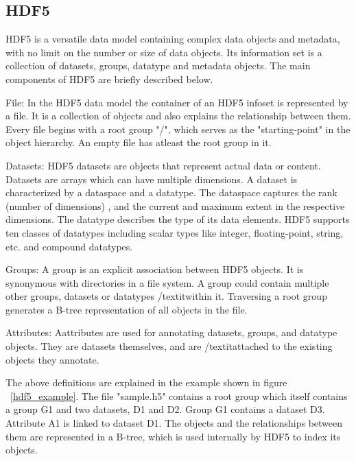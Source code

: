 \subsection{HDF5}
HDF5 is a versatile data model containing complex data objects and metadata, with no limit on the number or size of data objects. 
Its information set is a collection of datasets, groups, datatype and metadata objects. The main components of HDF5 are briefly described below.

File:
In the HDF5 data model the container of an HDF5 infoset
is represented by a file. It is a collection of objects and also explains the relationship between them.
Every file begins with a root group "/", which serves as the "starting-point" in the object hierarchy. An empty file has atleast the root group in it.

Datasets:
HDF5 datasets are objects that represent actual data or content. Datasets are arrays which can have multiple dimensions. A dataset is characterized by a dataspace and a datatype. The dataspace captures the rank (number of dimensions) , and the current and maximum extent in the respective dimensions. The datatype describes the type of its data elements. 
HDF5 supports ten classes of datatypes including scalar types like integer, floating-point, string, etc. and compound datatypes. 

Groups:
A group is an explicit association between HDF5 objects. It is synonymous with directories in a file system. A group could contain multiple other groups, datasets or datatypes /textit{within} it. 
Traversing a root group generates a B-tree representation of all objects in the file.

Attributes:
Aattributes are used for annotating datasets, groups, and datatype objects. They are datasets themselves, and are /textit{attached} to the existing objects they annotate. 

The above definitions are explained in the example shown in figure ~\ref{hdf5_example}. 
The file "sample.h5" contains a root group which itself contains a group G1 and two datasets, D1 and D2. Group G1 contains a dataset D3. Attribute A1 is linked to dataset D1. The objects and the relationships between them are represented in a B-tree, which is used internally by HDF5 to index its objects. 

